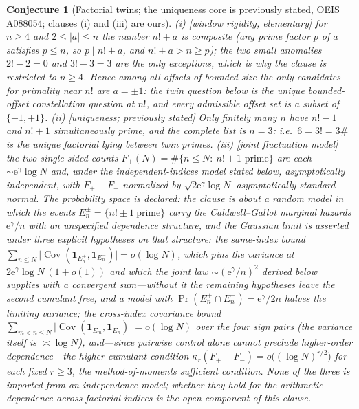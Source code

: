 \documentclass[11pt]{article}
\newtheorem{conjecture}{Conjecture}
\theoremstyle{definition}
\newcommand{\e}{\mathrm{e}}
\begin{document}
\setcounter{conjecture}{20}%
\begin{conjecture}[Factorial twins; the uniqueness core is previously
stated, OEIS A088054; clauses (i) and (iii) are ours]\label{c10}
\emph{(i)} [window rigidity, elementary] for $n\ge4$ and
$2\le|a|\le n$ the number $n!+a$ is composite (any prime factor $p$
of $a$ satisfies $p\le n$, so $p\mid n!+a$, and $n!+a>n\ge p$); the
two small anomalies $2!-2=0$ and $3!-3=3$ are the only exceptions,
which is why the clause is restricted to $n\ge4$.  Hence among all offsets
of bounded size the only
candidates for primality near $n!$ are $a=\pm1$: the twin question
below is the \emph{unique} bounded-offset constellation question at
$n!$, and every admissible offset set is a subset of $\{-1,+1\}$.
\emph{(ii)} [uniqueness; previously stated] Only finitely many $n$ have $n!-1$ and
$n!+1$ simultaneously prime, and the complete list is $n=3$: i.e.\
$6=3!=3\#$ is the unique factorial lying between twin primes.
\emph{(iii)} [joint fluctuation model] the two single-sided counts
$F_{\pm}(N)=\#\{n\le N:\ n!\pm1 \text{ prime}\}$ are each
$\sim\e^{\gamma}\log N$ and, \emph{under the independent-indices
model stated below}, asymptotically independent, with
$F_{+}-F_{-}$ normalized by $\sqrt{2\e^{\gamma}\log N}$
asymptotically standard normal.  The probability space is declared:
the clause is about a random model in which the events
$E_n^{\pm}=\{n!\pm1\ \text{prime}\}$ carry the Caldwell--Gallot
marginal hazards $\e^{\gamma}/n$ with an \emph{unspecified}
dependence structure, and the Gaussian limit is asserted under three explicit hypotheses on that structure: the same-index bound $\sum_{n\le N}\bigl|\operatorname{Cov}(\mathbf 1_{E_n^+},\mathbf 1_{E_n^-})\bigr|=o(\log N)$, which pins the variance at $2\e^{\gamma}\log N\,(1+o(1))$ and which the joint law $\sim(\e^{\gamma}/n)^2$ derived below supplies with a convergent sum---without it the remaining hypotheses leave the second cumulant free, and a model with $\Pr(E_n^+\cap E_n^-)=\e^{\gamma}/2n$ halves the limiting variance; the cross-index covariance bound
$\sum_{m<n\le N}\bigl|\operatorname{Cov}(\mathbf 1_{E_m},
\mathbf 1_{E_n})\bigr|=o(\log N)$ over the four sign pairs (the
variance itself is $\asymp\log N$), \emph{and}---since pairwise
control alone cannot preclude higher-order dependence---the
higher-cumulant condition
$\kappa_r(F_+-F_-)=o\bigl((\log N)^{r/2}\bigr)$ for each fixed
$r\ge3$, the method-of-moments sufficient condition.  None of the three is imported from an independence model; whether they hold for the
arithmetic dependence across
factorial indices is the open
component of this clause.
\end{conjecture}
\end{document}
